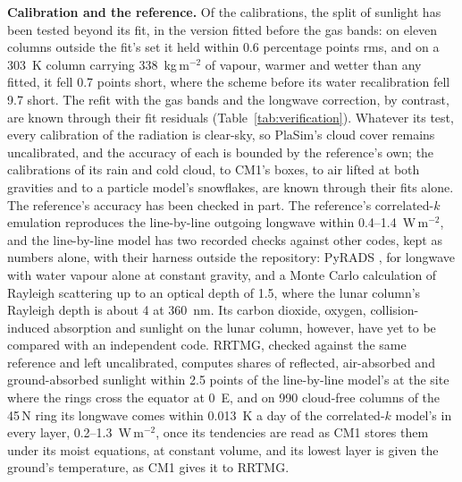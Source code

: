 \textbf{Calibration and the reference.} Of the calibrations, the split of sunlight has been tested beyond its
fit, in the version fitted before the gas bands: on eleven columns outside the fit's set it held within 0.6
percentage points rms, and on a 303~K column carrying 338~kg\,m$^{-2}$ of vapour, warmer and wetter than any fitted, it fell 0.7 points short, where the scheme before its water recalibration fell 9.7 short. The
refit with the gas bands and the longwave correction, by contrast, are known through their fit residuals
(Table~\ref{tab:verification}). Whatever its test, every calibration of the radiation is clear-sky, so PlaSim's cloud
cover remains uncalibrated, and the accuracy of each is bounded by the reference's own; the calibrations of its rain
and cold cloud, to CM1's boxes, to air lifted at both gravities and to a particle model's snowflakes, are known
through their fits alone. The reference's accuracy has been checked in part.
The reference's correlated-$k$ emulation reproduces the line-by-line outgoing longwave within 0.4--1.4~W\,m$^{-2}$,
and the line-by-line model has two recorded checks
against other codes, kept as numbers alone, with their harness outside the repository: PyRADS
\autocite{koll2018earth}, for longwave with water vapour alone at constant gravity, and a Monte Carlo calculation
of Rayleigh scattering up to an optical depth of 1.5, where the lunar column's Rayleigh depth is about 4 at
360~nm. Its carbon dioxide, oxygen, collision-induced absorption and sunlight on the lunar column, however, have
yet to be compared with an independent code. RRTMG, checked against the same reference and left uncalibrated, computes shares of reflected, air-absorbed and ground-absorbed sunlight within 2.5 points of the line-by-line model's at the site where the rings cross the equator at 0\textdegree~E, and on 990 cloud-free columns of the
45\textdegree\,N ring its longwave comes within 0.013~K a day of the correlated-$k$ model's in every layer,
0.2--1.3~W\,m$^{-2}$, once its tendencies are read as CM1 stores them under its moist equations, at constant volume,
and its lowest layer is given the ground's temperature, as CM1 gives it to RRTMG.

